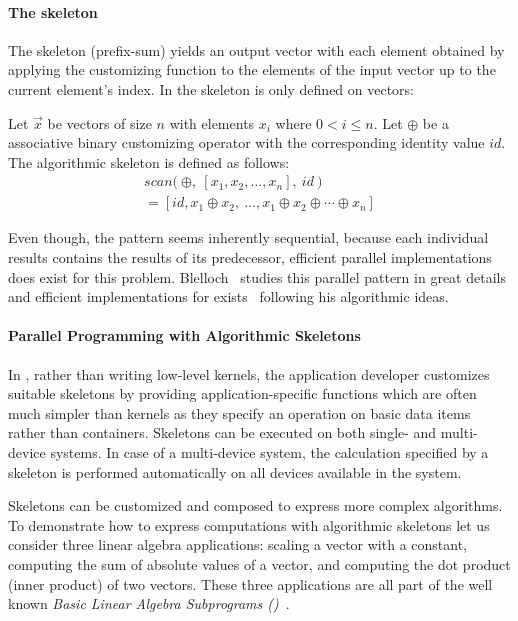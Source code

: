 \paragraph{The \scan skeleton}
The \scan skeleton (\aka prefix-sum) yields an output vector with each element obtained by applying the customizing function to the elements of the input vector up to the current element's index.
In \SkelCL the \scan skeleton is only defined on vectors:
\begin{definition}
  \label{definition:scan}
  Let $\vec{x}$ be vectors of size $n$ with elements $x_i$ where $0 < i \leq n$.
  Let $\oplus$ be a associative binary customizing operator with the corresponding identity value $id$.
  The algorithmic skeleton \scan is defined as follows:
  \begin{equation}
    \begin{split}
    scan \big(\ \oplus,\ [x_1, x_2, \dots, x_n],\ id\ \big) \\
      = [id, x_1 \oplus x_2,\ \dots,x_1 \oplus x_2 \oplus \cdots \oplus x_n]
    \end{split}
  \end{equation}
\end{definition}
\noindent
Even though, the \scan pattern seems inherently sequential, because each individual results contains the results of its predecessor, efficient parallel implementations does exist for this problem.
Blelloch~\cite{Blelloch1991} studies this parallel pattern in great details and efficient implementations for \GPUs exists~\cite{HarrisSeOw2007} following his algorithmic ideas.


\paragraph{Parallel Programming with Algorithmic Skeletons}
In \SkelCL, rather than writing low-level kernels, the application developer customizes suitable skeletons by providing application-specific functions which are often much simpler than kernels as they specify an operation on basic data items rather than containers.
Skeletons can be executed on both single- and multi-device systems.
In case of a multi-device system, the calculation specified by a skeleton is performed automatically on all devices available in the system.

Skeletons can be customized and composed to express more complex algorithms.
To demonstrate how to express computations with algorithmic skeletons let us consider three linear algebra applications:
scaling a vector with a constant, computing the sum of absolute values of a vector, and computing the dot product (\aka inner product) of two vectors.
These three applications are all part of the well known \emph{Basic Linear Algebra Subprograms (\BLAS)}~\cite{Dongarra2002,Dongarra2002a}.


